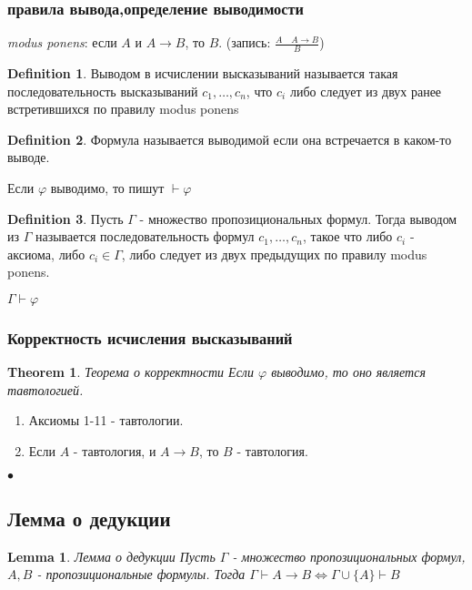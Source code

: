 \documentclass[a4paper]{article}
\theoremstyle{plain}
\newtheorem{theorem}{Theorem}
\newtheorem{lem}{Lemma}
\theoremstyle{remark}
\theoremstyle{definition}
\newtheorem{definition}{Definition}
\renewenvironment{proof}{{\bfseries Proof}}{$\bullet$}
\begin{document}
\subsubsection{правила вывода,определение выводимости}
\emph{modus ponens}: если $A$ и $A \rightarrow B$, то $B$. (запись: $\frac{A\quad A \rightarrow B}{B}$)

\begin{definition}
	Выводом в исчислении высказываний называется такая последовательность высказываний $c_1, \ldots, c_n$, что $c_i$ либо следует из двух ранее встретившихся по правилу modus ponens
\end{definition}

\begin{definition}
	Формула называется выводимой если она встречается в каком-то выводе.
\end{definition}
\begin{designation}
	Если $\varphi$ выводимо, то пишут $\vdash \varphi$
\end{designation}

\begin{definition}
	Пусть $\Gamma$ - множество пропозициональных формул. Тогда выводом из $\Gamma$ называется последовательность формул $c_1, \ldots, c_n$, такое что либо $c_i$ - аксиома, либо $c_i \in \Gamma$, либо следует из двух предыдущих по правилу modus ponens. 
\end{definition}

\begin{designation}
	$\Gamma \vdash \varphi$
\end{designation}
\subsubsection{Корректность исчисления высказываний}
\begin{theorem}{Теорема о корректности}
	Если $\varphi$ выводимо, то оно является тавтологией.
\end{theorem}

\begin{proof}
\begin{enumerate}
	\item Аксиомы 1-11 - тавтологии.\\
	\item Если $A$ - тавтология, и $A\rightarrow B$, то $B$ - тавтология.
\end{enumerate}
\end{proof}


\subsection{Лемма о дедукции}
\begin{lem}{Лемма о дедукции}
	\newline
	Пусть $\Gamma$ - множество пропозициональных формул, $A,B$ - пропозициональные формулы. Тогда $\Gamma \vdash A \rightarrow B \Leftrightarrow \Gamma \cup \{A\} \vdash B$
\end{lem}
\end{document}
